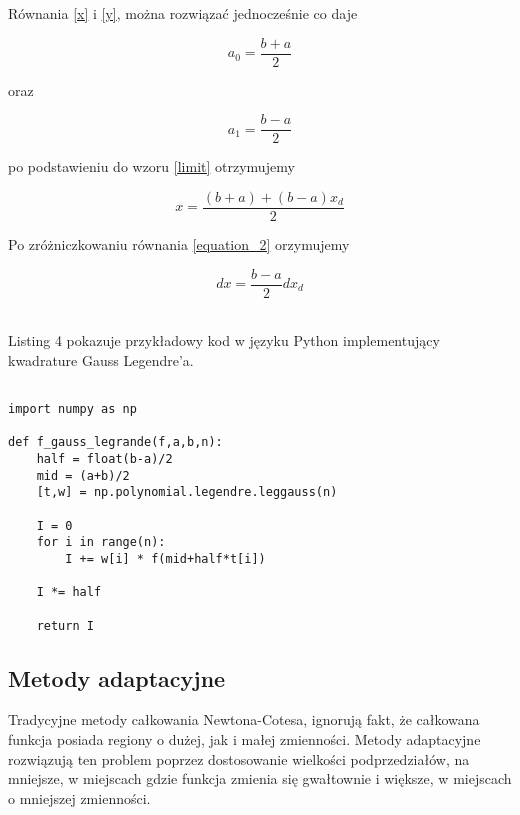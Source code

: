 \documentclass[12pt,twoside]{article}
\begin{document}
Równania \eqref{x} i \eqref{y}, można rozwiązać jednocześnie co daje

\begin{equation}
a_0 = \frac{b+a}{2}
\end{equation}

oraz

\begin{equation}
a_1 = \frac{b-a}{2}
\end{equation}

po podstawieniu do wzoru \eqref{limit} otrzymujemy

\begin{equation}
x = \frac{(b+a)+(b-a)x_d}{2}
\label{equation_2}
\end{equation}

Po zróżniczkowaniu równania \eqref{equation_2} orzymujemy

\begin{equation}
dx = \frac{b-a}{2} dx_d
\end{equation}

\cite{limits_of_int}\\

Listing 4 pokazuje przykładowy kod w języku Python implementujący kwadrature Gauss Legendre'a.

\begin{lstlisting}[caption={Kod w języku python implementujący metodę Gaussa Legendre'a}]

import numpy as np

def f_gauss_legrande(f,a,b,n):
    half = float(b-a)/2
    mid = (a+b)/2
    [t,w] = np.polynomial.legendre.leggauss(n)

    I = 0
    for i in range(n):
        I += w[i] * f(mid+half*t[i])

    I *= half

    return I

\end{lstlisting}
\label{Listing 4}

\subsection{Metody adaptacyjne}

Tradycyjne metody całkowania Newtona-Cotesa, ignorują fakt, że całkowana funkcja posiada regiony o dużej, jak i małej zmienności.
Metody adaptacyjne rozwiązują ten problem poprzez dostosowanie wielkości podprzedziałów, na mniejsze, w miejscach gdzie funkcja zmienia się gwałtownie i większe, w miejscach o mniejszej zmienności\cite{adaptive}.
\end{document}
